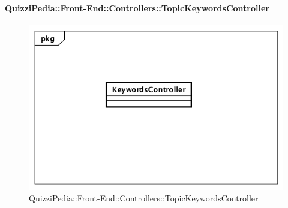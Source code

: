 \paragraph{QuizziPedia::Front-End::Controllers::TopicKeywordsController}
\begin{figure} [ht]
	\centering
	\includegraphics[scale=0.45]{UML/Classi/Front-End/QuizziPedia_Front-end_Controller_TopicKeywordsController.png}
	\caption{QuizziPedia::Front-End::Controllers::TopicKeywordsController}
\end{figure} \FloatBarrier
